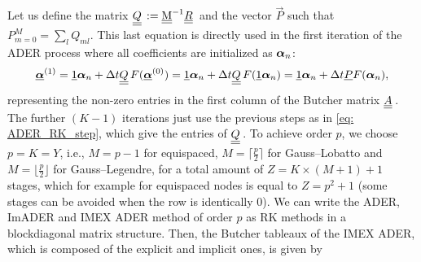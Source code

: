 Let us define the matrix $\mat{Q}:=\M^{-1} \mat{R}$ and the vector $\vec{P}$ such that $P_{m=0}^M=\sum_l Q_{ml}$. This last equation is directly used in the first iteration of the ADER process where all coefficients are initialized as $\boldsymbol{\alpha}_n$:
\begin{align*}
\vec{\bc}^{(1)}=\vec{1}\bc_n+\Delta t \mat{Q} F(\vec{\bc}^{(0)})
=\vec{1}\bc_n+\Delta t \mat{Q} F(\vec{1}\bc_n) 
=\vec{1}\bc_n+\Delta t \vec{P} F(\bc_n),
\end{align*}
representing the non-zero entries in the first column of the Butcher matrix $\mat{A}$. The further $(K-1)$ iterations just use the previous steps as in \eqref{eq: ADER_RK_step}, which give the entries of $\mat{Q}$. To achieve order $p$, we choose $p=K=Y$, i.e., $M=p-1$ for equispaced, $M=\lceil \frac{p}{2} \rceil$ for Gauss--Lobatto and $M = \lfloor \frac{p}{2} \rfloor$ for Gauss--Legendre, %
for a total amount of $Z=K\times (M+1)+1$ stages, which for example for equispaced nodes is equal to $Z=p^2+1$ \cite{veiga2023improving} (some stages can be avoided when the row is identically 0). We can write the ADER, ImADER and IMEX ADER method of order $p$ as RK methods in a blockdiagonal matrix structure. Then, the Butcher tableaux of the IMEX ADER, which is composed of the explicit and implicit ones, is given by
%
%
%
%
